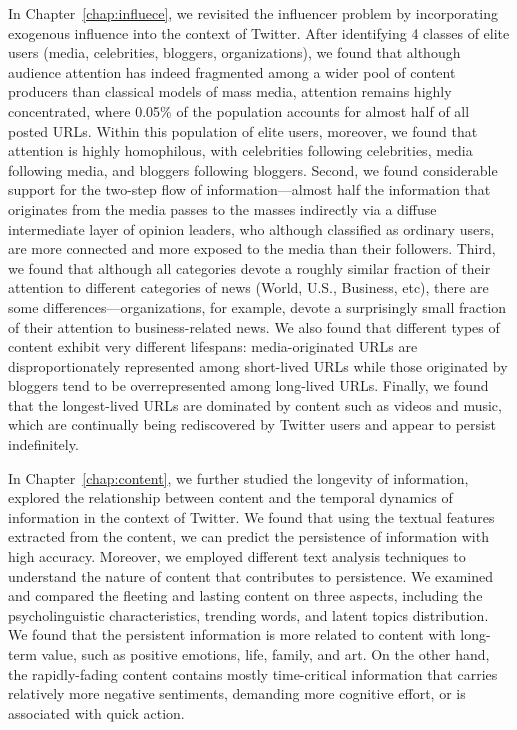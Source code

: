 \documentclass[phd,tocprelim]{cornell}
\begin{document}
In Chapter~\ref{chap:influece}, we revisited the influencer problem by incorporating exogenous influence into the context of Twitter.  
After identifying 4 classes of elite users (media, celebrities, bloggers, organizations), we found that although audience attention has indeed fragmented among a wider pool of content producers than classical models of mass media,
attention remains highly concentrated, where 0.05\% of the population
accounts for almost half of all posted URLs.  Within this
population of elite users, moreover, we found that attention is highly homophilous, with
celebrities following celebrities, media following media, and bloggers
following bloggers.  Second, we found considerable support for the two-step
flow of information---almost half the information that originates from the
media passes to the masses indirectly via a diffuse intermediate layer of
opinion leaders, who although classified as ordinary users, are more
connected and more exposed to the media than their followers.  Third, we
found that although all categories devote a roughly similar fraction of
their attention to different categories of news (World, U.S., Business,
etc), there are some differences---organizations, for example, devote a
surprisingly small fraction of their attention to business-related news.
We also found that different types of content exhibit very different
lifespans: media-originated URLs are disproportionately represented among
short-lived URLs while those originated by bloggers tend to be
overrepresented among long-lived URLs. Finally, we found that the
longest-lived URLs are dominated by content such as videos and music, which
are continually being rediscovered by Twitter users and appear to persist
indefinitely. 

In Chapter~\ref{chap:content}, we further studied the longevity of information, explored the relationship between content and the temporal dynamics of information in the context of Twitter. We found that using the textual features extracted from the content, we can predict the persistence of information with high accuracy. Moreover, we employed different text analysis techniques to understand the nature of content that contributes to persistence. We examined and compared the fleeting and lasting content on three aspects, including the psycholinguistic characteristics, trending words, and latent topics distribution. We found that the persistent information is more related to content with long-term value, such as positive emotions, life, family, and art. On the other hand, the rapidly-fading content contains
 mostly time-critical information that carries relatively more negative
sentiments, demanding more cognitive effort, or is associated with
quick action.
\end{document}
